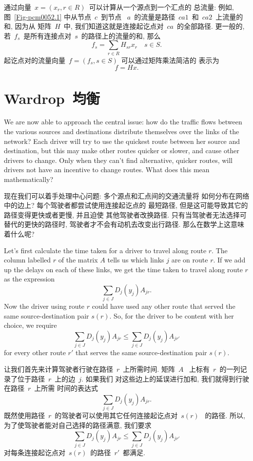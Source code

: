 \documentclass[a4paper,12pt, twocolumn]{article}
\begin{document}
通过向量~$x =(x_r,r \in R)$~可以计算从一个源点到一个汇点的
总流量: 例如, 图~\ref{Fig-pcm0052.1} 中从节点~$c$~到节点
~$a$~的流量是路径~$ca1$~和~$ca2$~上流量的和, 因为从
矩阵~$H$~中, 我们知道这就是连接起讫点对~$ca$~的全部路径. 
更一般的, 若~$f_{s}$~是所有连接点对~$s$~的路径上的流量的和, 
那么
\[
f_s  = \sum_{r \in R} H_{sr} x_r    \quad s 
\in S.
\]
起讫点对的流量向量~$f =(f_s,s \in S )$~可以通过矩阵乘法简洁的
表示为
\[
f = H x.
\]

\section{Wardrop~均衡}

We are now able to approach the central issue: how do the
traffic flows between the various sources and destinations
distribute themselves over the links of the network? 
Each driver
will try to use the quickest route between her source and destination,
but this may make other routes quicker or slower, and cause other
drivers to change. Only when they can't find alternative, quicker routes,
will drivers not have an incentive to change routes.
What does this mean mathematically?

现在我们可以着手处理中心问题: 多个源点和汇点间的交通流量将
如何分布在网络中的边上? 每个驾驶者都尝试使用连接起讫点的
最短路径, 但是这可能导致其它的路径变得更快或者更慢, 并且迫使
其他驾驶者改换路径. 只有当驾驶者无法选择可替代的更快的路径时, 
驾驶者才不会有动机去改变出行路径. 那么在数学上这意味着什么呢? 

Let's first calculate the time taken for a driver to travel along 
route $r$. The column labelled $r$ of the matrix $A$ tells us
which links $j$ are on route $r$. If we add up the
delays on each of these links, we get the time
taken to travel along route $r$ as the expression 
$$\sum_{j\in J } D_j (y_j) A _{jr}. $$ 
Now the driver using route $r$ could have used 
any other route that served the same source-destination pair $s(r)$.
So, for the driver to be content with her choice, we 
require
$$\sum_{j\in J } D_j (y_j) A _{jr}
\leq \sum_{j\in J } D_j (y_j) A _{jr'} $$
for every other route $r'$ that serves the 
same source-destination pair $s(r)$.

让我们首先来计算驾驶者行驶在路径~$r$~上所需时间. 矩阵~$A$~
上标有~$r$~的一列记录了位于路径~$r$~上的边~$j$. 如果我们
对这些边上的延误进行加和, 我们就得到行驶在路径~$r$~上所需
时间的表达式
$$\sum_{j\in J } D_j (y_j) A _{jr}. $$
既然使用路径~$r$~的驾驶者可以使用其它任何连接起讫点对~$s(r)$~
的路径. 所以, 为了使驾驶者能对自己选择的路径满意, 我们要求
$$\sum_{j\in J } D_j (y_j) A _{jr}
\leq \sum_{j\in J } D_j (y_j) A _{jr'} $$
对每条连接起讫点对~$s(r)$~的路径~$r'$~都满足. 
\end{document}
